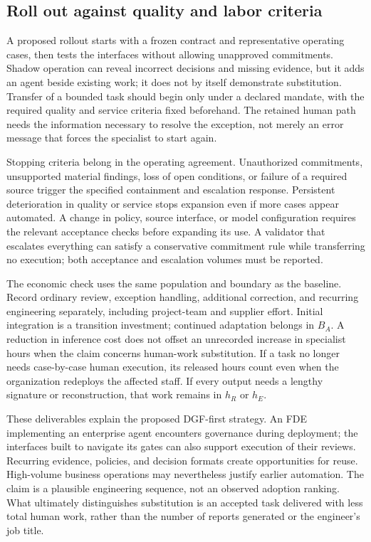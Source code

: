 \subsection{Roll out against quality and labor criteria}

A proposed rollout starts with a frozen contract and representative operating cases, then
tests the interfaces without allowing unapproved commitments. Shadow operation can reveal
incorrect decisions and missing evidence, but it adds an agent beside existing work; it
does not by itself demonstrate substitution. Transfer of a bounded task should begin only
under a declared mandate, with the required quality and service criteria fixed beforehand.
The retained human path needs the information necessary to resolve the exception, not merely
an error message that forces the specialist to start again.

Stopping criteria belong in the operating agreement. Unauthorized commitments, unsupported
material findings, loss of open conditions, or failure of a required source trigger the
specified containment and escalation response. Persistent deterioration in quality or
service stops expansion even if more cases appear automated. A change in policy, source
interface, or model configuration requires the relevant acceptance checks before expanding
its use. A validator that escalates everything can satisfy a conservative commitment rule
while transferring no execution; both acceptance and escalation volumes must be reported.

The economic check uses the same population and boundary as the baseline. Record ordinary
review, exception handling, additional correction, and recurring engineering separately,
including project-team and supplier effort. Initial integration is a transition investment;
continued adaptation belongs in $B_A$. A reduction in inference cost does not offset an
unrecorded increase in specialist hours when the claim concerns human-work substitution.
If a task no longer needs case-by-case human execution, its released hours count even when
the organization redeploys the affected staff. If every output needs a lengthy signature
or reconstruction, that work remains in $h_R$ or $h_E$.

These deliverables explain the proposed DGF-first strategy. An FDE implementing an enterprise
agent encounters governance during deployment; the interfaces built to navigate its gates
can also support execution of their reviews. Recurring evidence, policies, and decision
formats create opportunities for reuse. High-volume business operations may nevertheless
justify earlier automation. The claim is a plausible engineering sequence, not an observed
adoption ranking. What ultimately distinguishes substitution is an accepted task delivered
with less total human work, rather than the number of reports generated or the engineer's
job title.
